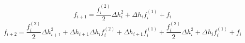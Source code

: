 \begin{equation} 
f_{{i+1}} = \frac{f^{{(2)}}_{i}}{2} \Delta h_{{i}}^{2} + \Delta h_{{i}} f^{{(1)}}_{i} + f_{i}
 \end{equation} 
\begin{equation} 
f_{{i+2}} = \frac{f^{{(2)}}_{i}}{2} \Delta h_{{i+1}}^{2} + \Delta h_{{i+1}} \Delta h_{{i}} f^{{(2)}}_{i} + \Delta h_{{i+1}} f^{{(1)}}_{i} + \frac{f^{{(2)}}_{i}}{2} \Delta h_{{i}}^{2} + \Delta h_{{i}} f^{{(1)}}_{i} + f_{i}
 \end{equation} 
